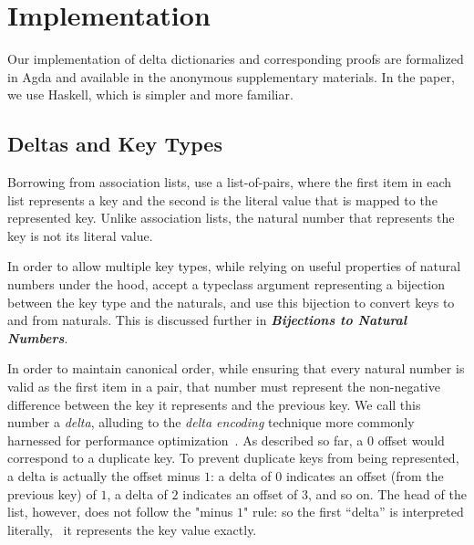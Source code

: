 \section{Implementation}
\label{sec:DD}



Our implementation of delta dictionaries and corresponding proofs are formalized in Agda and available in the anonymous supplementary materials.
%
In the paper, we use Haskell, which is simpler and more familiar.

\subsection{Deltas and Key Types}

Borrowing from association lists, \dds{} use a list-of-pairs, where the first item in each list represents a key and the second is the literal value that is mapped to the represented key.
%
Unlike association lists, the natural number that represents the key is not its literal value.

In order to allow multiple key types, while relying on useful properties of natural numbers under the hood, \dds{} accept a typeclass argument representing a bijection
%
between the key type and the naturals, and use this bijection to convert keys to and from naturals. This is discussed further in \emph{\textbf{Bijections to Natural Numbers}}.

In order to maintain canonical order, while ensuring that every natural number is valid as the first item in a pair, that number must represent the non-negative difference between the key it represents and the previous key.
%
We call this number a \emph{delta}, alluding to the \emph{delta encoding} technique more commonly harnessed for performance optimization~\citep{XXX}.
%
As described so far, a $0$ offset would correspond to a duplicate key.
%
To prevent duplicate keys from being represented, a delta is actually the offset minus $1$: a delta of $0$ indicates an offset (from the previous key) of $1$, a delta of $2$ indicates an offset of $3$, and so on.
%
The head of the list, however, does not follow the "minus $1$" rule: so the first ``delta'' is interpreted literally, \ie{}~it represents the key value exactly.

